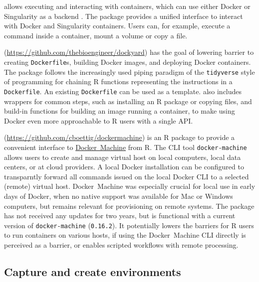 \textbf{} allows executing and interacting with
containers, which can use either Docker or Singularity as a backend
\citep{cannoodt_babelwhale_2019}. The package provides a unified
interface to interact with Docker and Singularity containers. Users can,
for example, execute a command inside a container, mount a volume or
copy a file.

\textbf{}
(\url{https://github.com/thebioengineer/dockyard}) has the goal of
lowering barrier to creating \texttt{Dockerfile}s, building Docker
images, and deploying Docker containers. The package follows the
increasingly used piping paradigm of the \texttt{tidyverse} style of
programming for chaining R functions representing the instructions in a
\texttt{Dockerfile}. An existing \texttt{Dockerfile} can be used as a
template.  also includes wrappers for common steps, such
as installing an R package or copying files, and build-in functions for
building an image running a container, to make using Docker even more
approachable to R users with a single API.

\textbf{}
(\url{https://github.com/cboettig/dockermachine}) is an R package to
provide a convenient interface to
\href{https://docs.docker.com/machine/overview/}{Docker~Machine} from R.
The CLI tool \texttt{docker-machine} allows users to create and manage
virtual host on local computers, local data centers, or at cloud
providers. A local Docker installation can be configured to transparntly
forward all commands issued on the local Docker CLI to a selected
(remote) virtual host. Docker~Machine was especially crucial for local
use in early days of Docker, when no native support was available for
Mac or Windows computers, but remains relevant for provisioning on
remote systems. The package has not received any updates for two years,
but is functional with a current version of \texttt{docker-machine}
(\texttt{0.16.2}). It potentially lowers the barriers for R users to run
containers on various hosts, if using the Docker~Machine CLI directly is
perceived as a barrier, or enables scripted workflows with remote
processing.

\hypertarget{capture-and-create-environments}{%
\subsection{Capture and create
environments}\label{capture-and-create-environments}}

\label{envs}

